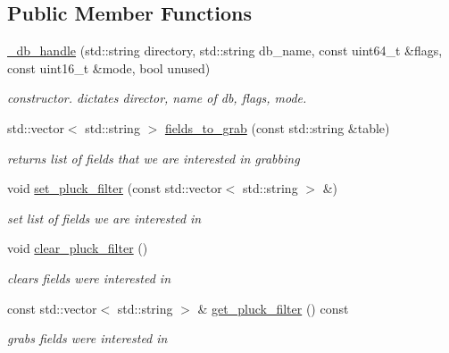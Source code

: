 \subsection*{Public Member Functions}
\begin{DoxyCompactItemize}
\item 
\hyperlink{structmods_1_1lmdb_1_1__db__handle_a85925e9d8d0e168f64a9db2a95328e69}{\+\_\+db\+\_\+handle} (std\+::string directory, std\+::string db\+\_\+name, const uint64\+\_\+t \&flags, const uint16\+\_\+t \&mode, bool unused)
\begin{DoxyCompactList}\small\item\em constructor. dictates director, name of db, flags, mode. \end{DoxyCompactList}\item 
std\+::vector$<$ std\+::string $>$ \hyperlink{structmods_1_1lmdb_1_1__db__handle_a131a1099a47fc324190bacaeb984cd33}{fields\+\_\+to\+\_\+grab} (const std\+::string \&table)
\begin{DoxyCompactList}\small\item\em returns list of fields that we are interested in grabbing \end{DoxyCompactList}\item 
void \hyperlink{structmods_1_1lmdb_1_1__db__handle_a89d952ebde51897bf5677a570cb6ec42}{set\+\_\+pluck\+\_\+filter} (const std\+::vector$<$ std\+::string $>$ \&)
\begin{DoxyCompactList}\small\item\em set list of fields we are interested in \end{DoxyCompactList}\item 
\mbox{\label{structmods_1_1lmdb_1_1__db__handle_a08f55815fcfda198243ad56f6c6c77d5}} 
void \hyperlink{structmods_1_1lmdb_1_1__db__handle_a08f55815fcfda198243ad56f6c6c77d5}{clear\+\_\+pluck\+\_\+filter} ()
\begin{DoxyCompactList}\small\item\em clears fields we\textquotesingle{}re interested in \end{DoxyCompactList}\item 
const std\+::vector$<$ std\+::string $>$ \& \hyperlink{structmods_1_1lmdb_1_1__db__handle_ad5ac6cd8bed5f6330b1fecf8f9a55f8e}{get\+\_\+pluck\+\_\+filter} () const
\begin{DoxyCompactList}\small\item\em grabs fields we\textquotesingle{}re interested in \end{DoxyCompactList}\item 

\end{DoxyCompactItemize}
